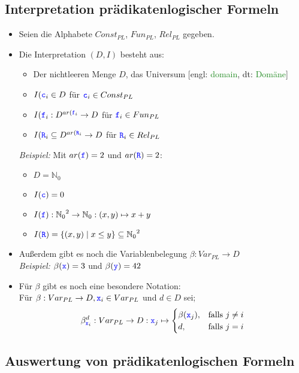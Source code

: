 \documentclass{article}
\newcommand{\Nz}{{\mathbb{N}_0}} %
\newcommand{\blue}[1]{\textcolor{blue}{#1}}
\newcommand{\important}[1]{\textcolor{importantColor}{#1}}
\newcommand{\verweis}[1]{\textcolor{ForestGreen}{#1}}
\newcommand{\example}[1]{\textit{Beispiel: }#1}
\newcommand{\word}[1]{\blue{\texttt{#1}}}
\newcommand{\set}[1]{\{#1\}}
\begin{document}
\subsection{\important{Interpretation} prädikatenlogischer Formeln}
\begin{itemize}
    \item Seien die Alphabete $Const_{PL}$, $Fun_{PL}$, $Rel_{PL}$ gegeben.
    \item Die Interpretation $(D, I)$ besteht aus:
    \begin{itemize}
        \item Der nichtleeren Menge $D$, das \important{Universum} [engl: \verweis{domain}, dt: \verweis{Domäne}]
        \item $I(\word{c}_i \in D$ für $\word{c}_i \in Const_{PL}$
        \item $I(\word{f}_i : D^{ar(\word{f}_i}\to D$ für $\word{f}_i \in Fun_{PL}$
        \item $I(\word{R}_i \subseteq D^{ar(\word{R}_i}\to D$ für $\word{R}_i \in Rel_{PL}$
    \end{itemize}
    \example{Mit $ar(\word{f}) = 2$ und $ar(\word{R})=2$:}
    \begin{itemize}
        \item $D = \Nz$
        \item $I(\word{c})=0$
        \item $I(\word{f}): \Nz^2\to\Nz:(x,y)\mapsto x+y$
        \item $I(\word{R}) = \set{(x,y)\mid x\leq y} \subseteq\Nz^2$
    \end{itemize}
    \item Außerdem gibt es noch die \important{Variablenbelegung} $\beta: Var_{PL}\to D$\\
    \example{$\beta(\word{x})=3$ und $\beta(\word{y})=42$}
    \item Für $\beta$ gibt es noch eine besondere Notation:\\
    Für $\beta: Var_{PL}\to D,\word{x}_i\in Var_{PL}$ und $d\in D$ sei;
    \[ \beta^d_{\word{x}_i}: Var_{PL} \to D: \word{x}_j \mapsto 
    \begin{cases}
        \beta(\word{x}_j), &$falls $j\not=i\\
        d, &$falls $j=i
    \end{cases}
    \]
\end{itemize} 

\subsection{Auswertung von prädikatenlogischen Formeln}
\end{document}
